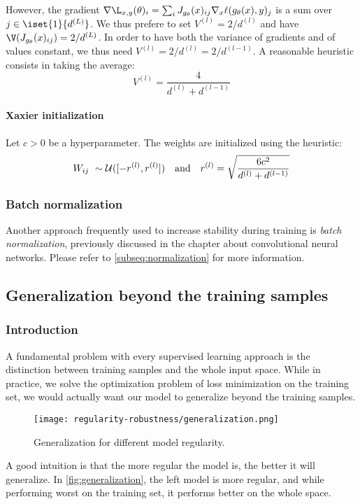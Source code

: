  However, the gradient $\nabla\L_{x,y}(\theta)_i = \sum_iJ_{g_\theta}(x)_{ij}\nabla_x\ell(g_\theta(x),y)_j$ is a sum over $j\in\iset{1}{d^{(L)}}$. We thus prefere to set $V^{(l)}=2/d^{(l)}$ and have $\V(J_{g_\theta}(x)_{ij})=2/d^{(L)}$. In order to have both the variance of gradients and of values constant, we thus need $V^{(l)}=2/d^{(l)}=2/d^{(l-1)}$. A reasonable heuristic consists in taking the average:
\begin{equation*}
    V^{(l)} = \frac{4}{d^{(l)}+d^{(l-1)}}
\end{equation*}

\paragraph*{Xaxier initialization} Let $c>0$ be a hyperparameter. The weights are initialized using the heuristic:
\begin{equation*}
    W_{ij} \sim \mathcal{U}([-r^{(l)}, r^{(l)}]) \quad \textnormal{and} \quad r^{(l)}=\sqrt{\frac{6c^2}{d^{(l)}+d^{(l-1)}}}
\end{equation*}

\subsubsection{Batch normalization}
Another approach frequently used to increase stability during training is \emph{batch normalization}, previously discussed in the chapter about convolutional neural networks. Please refer to \autoref{subseq:normalization} for more information.

\subsection{Generalization beyond the training samples}
\subsubsection{Introduction}
A fundamental problem with every supervised learning approach is the distinction between training samples and the whole input space. While in practice, we solve the optimization problem of loss minimization on the training set, we would actually want our model to generalize beyond the training samples. 
\begin{figure}[H]
    \centering
    \texttt{[image: regularity-robustness/generalization.png]}
    \caption{Generalization for different model regularity.}
    \label{fig:generalization}  
\end{figure}
A good intuition is that the more regular the model is, the better it will generalize. In \autoref{fig:generalization}, the left model is more regular, and while performing worst on the training set, it performs better on the whole space.

